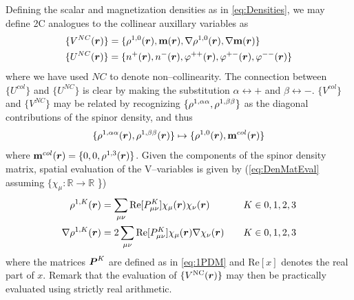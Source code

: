 Defining the scalar and magnetization densities as in \cref{eq:Densities}, we may define 2C analogues
to the collinear auxillary variables as
\begin{align}
  \label{eq:NCAuxVar}
  &\{ V^{NC}(\boldsymbol{r}) \} = \{ \rho^{1,0}(\boldsymbol{r}), \mathbf{m}(\boldsymbol{r}), \nabla \rho^{1,0}(\boldsymbol{r}), \nabla \mathbf{m}(\boldsymbol{r}) \} \\
  &\{ U^{NC}(\boldsymbol{r}) \} = \{ n^+(\boldsymbol{r}), n^-(\boldsymbol{r}), \varphi^{++}(\boldsymbol{r}), \varphi^{+-}(\boldsymbol{r}), \varphi^{--}(\boldsymbol{r}) \}
\end{align}
where we have used $NC$ to denote non--collinearity. The connection between $\{U^{col}\}$ and $\{U^{NC}\}$
is clear by making the substitution $\alpha \leftrightarrow +$ and $\beta \leftrightarrow -$. 
$\{V^{col}\}$ and $\{V^{NC}\}$ may be related by recognizing $\{\rho^{1,{\alpha\alpha}},\rho^{1,{\beta\beta}}\}$ as the diagonal contributions
of the spinor density, and thus
\begin{equation}
  \{\rho^{1,{\alpha\alpha}}(\boldsymbol{r}), \rho^{1,{\beta\beta}}(\boldsymbol{r})\} \mapsto \{\rho^{1,0}(\boldsymbol{r}), \mathbf{m}^{col}(\boldsymbol{r})\}
\end{equation}
where $\mathbf{m}^{col}(\boldsymbol{r}) = \{0,0,\rho^{1,3}(\boldsymbol{r})\}$. Given the components of the spinor density matrix,
spatial evaluation of the V--variables is given by (\cref{eq:DenMatEval} assuming $\{ \chi_\mu : \mathbb R \rightarrow \mathbb R$ \})
\begin{alignat}{2}
  \label{eq:VVarEval}
  \rho^{1,K}(\boldsymbol{r}) &= \sum_{\mu\nu} \mathrm{Re}[P^K_{\mu\nu}] \chi_\mu(\boldsymbol{r}) \chi_\nu(\boldsymbol{r}) \quad && K \in{0,1,2,3}\\
  \nabla\rho^{1,K}(\boldsymbol{r}) &= 2\sum_{\mu\nu} \mathrm{Re}[P^K_{\mu\nu}] \chi_\mu(\boldsymbol{r}) \nabla\chi_\nu(\boldsymbol{r})\quad && K \in{0,1,2,3}
\end{alignat}
where the matrices $\boldsymbol{P}^K$ are defined as in \cref{eq:1PDM} and $\mathrm{Re}[x]$ denotes the real part of $x$. Remark that the evaluation of $\{V^{\mathrm{NC}}(\boldsymbol{r})\}$ may then be practically 
evaluated using strictly real arithmetic.

